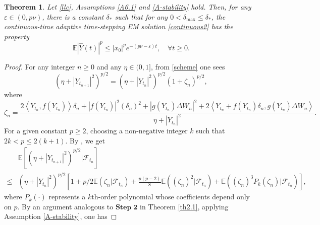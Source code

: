 \documentclass[preprint,12pt,compress]{elsarticle}
\newtheorem{theorem}{Theorem}[section] %
\begin{document}
\begin{theorem}  \label{Th-numer-stability}
Let \eqref{llc}, Assumptions \ref{A6.1} and \ref{A-stability} hold. Then, 
for any $\varepsilon \in (0,p\nu)$, there is a constant $\delta_*$ such that for any $0 <\delta_{\max} \le \delta_*$,
the continuous-time adaptive time-stepping EM solution \eqref{continuous2} has the property
\begin{equation*}
	\mathbb{E}{\left| {\hat Y(t)} \right|^p} \le {\left| {{x_0}} \right|^p}{e^{ - \left( {p\nu  - \varepsilon } \right)t}}, \quad \forall t\ge 0.
\end{equation*}
\end{theorem}
\begin{proof}
For any interger $n \ge 0$ and any $\eta \in (0, 1]$, from \eqref{scheme} one sees
\begin{equation} \label{gh11}
	{\left( {\eta  + {{\left| {{Y_{{t_{n + 1}}}}} \right|}^2}} \right)^{p/2}} = {\left( {\eta  + {{\left| {{Y_{{t_n}}}} \right|}^2}} \right)^{p/2}}{\left( {1 + \zeta _n } \right)^{p/2}}  ,
\end{equation}
where
\begin{equation*}
	\zeta _n  = \frac{{2\left\langle {{Y_{{t_n}}},f({Y_{{t_n}}})} \right\rangle \delta _n  + {{\left| {f({Y_{{t_n}}})} \right|}^2}{{\left( {\delta _n } \right)}^2} + {{\left| {g({Y_{{t_n}}})\Delta {W_n}} \right|}^2} + 2\left\langle {{Y_{{t_n}}} + f({Y_{{t_n}}})\delta _n ,g({Y_{{t_n}}})\Delta {W_n}} \right\rangle }}{{\eta  + {{\left| {{Y_{{t_n}}}} \right|}^2}}} .
\end{equation*}
For a given constant $p \ge 2$, choosing a non-negative integer $k$ such that $2k < p \le 2(k+1)$. By \cite[Lemma 3.3]{yang2018explicit}, we get
\begin{equation}  \label{gh7}
	\begin{split}
		&\mathbb{E}\left[ {{{\left( {\eta + {{\left| {{Y_{{t_{n + 1}}}}} \right|}^2}} \right)}^{p/2}}|{\mathcal{F}_{{t_n}}}} \right] \\
		\le& {\left( {\eta + {{\left| {{Y_{{t_n}}}} \right|}^2}} \right)^{p/2}}\left[ {1 + p/2\mathbb{E}(\zeta _n |{\mathcal{F}_{{t_n}}}) + \frac{{p(p - 2)}}{8}\mathbb{E}({{(\zeta _n )}^2}|{\mathcal{F}_{{t_n}}}) + \mathbb{E}({{(\zeta _n )}^3}{P_k}(\zeta _n )|{\mathcal{F}_{{t_n}}})} \right],
	\end{split}
\end{equation}
where $P_k(\cdot)$ represents a $k$th-order polynomial whose coefficients
depend only on $p$. By an argument analogous to $\mathbf{Step\;2}$ in Theorem \ref{th2.1}, applying Assumption \ref{A-stability}, one has

\end{proof}
\end{document}
